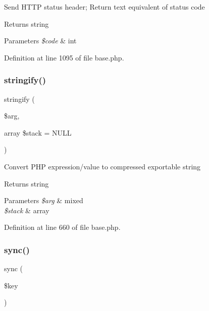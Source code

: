 Send H\+T\+TP status header; Return text equivalent of status code \begin{DoxyReturn}{Returns}
string 
\end{DoxyReturn}

\begin{DoxyParams}{Parameters}
{\em \$code} & int \\
\hline
\end{DoxyParams}


Definition at line 1095 of file base.\+php.

\hypertarget{class_base_adb7cb366d6c6e4d4338bc35e76dfaf67}{}\label{class_base_adb7cb366d6c6e4d4338bc35e76dfaf67} 
\subsubsection{\texorpdfstring{stringify()}{stringify()}}
{\footnotesize\ttfamily stringify (\begin{DoxyParamCaption}\item[{}]{\$arg,  }\item[{array}]{\$stack = {\ttfamily NULL} }\end{DoxyParamCaption})}

Convert P\+HP expression/value to compressed exportable string \begin{DoxyReturn}{Returns}
string 
\end{DoxyReturn}

\begin{DoxyParams}{Parameters}
{\em \$arg} & mixed \\
\hline
{\em \$stack} & array \\
\hline
\end{DoxyParams}


Definition at line 660 of file base.\+php.

\hypertarget{class_base_aada982ed0466e5ed14d4fcbe22c61840}{}\label{class_base_aada982ed0466e5ed14d4fcbe22c61840} 
\subsubsection{\texorpdfstring{sync()}{sync()}}
{\footnotesize\ttfamily sync (\begin{DoxyParamCaption}\item[{}]{\$key }\end{DoxyParamCaption})}

